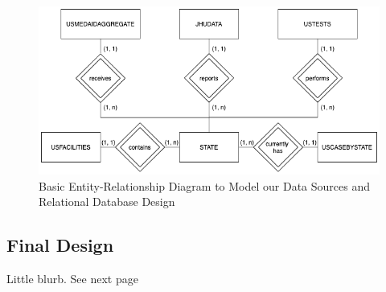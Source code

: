 \documentclass[11pt]{article}
\begin{document}
\FloatBarrier
\begin{figure}[h]
    \centering
    \includegraphics[width=\textwidth]{diagrams/ER2.png}
    \caption{Basic Entity-Relationship Diagram to Model our Data Sources and Relational Database Design}
    \label{fig:er1}
\end{figure}
\FloatBarrier

\subsection{Final Design}

\noindent
Little blurb. See next page

\pagebreak
\end{document}
